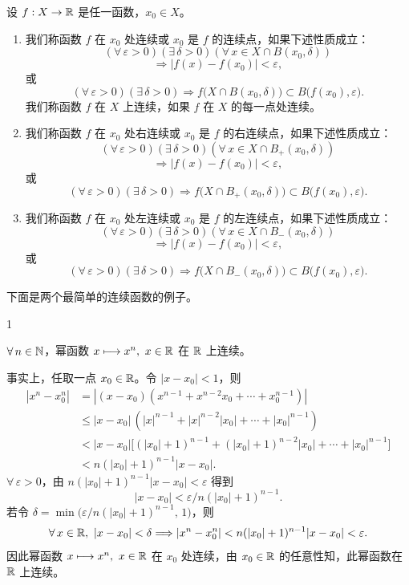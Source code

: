 \begin{mydef*}{}

	设 \(f:X\to\mathbb{R}\) 是任一函数，\(x_0\in X\)。

	\begin{enumerate}[label=\arabic*)]
		\item 我们称函数 \(f\) 在 \(x_0\) 处连续或 \(x_0\) 是 \(f\) 的连续点，如果下述性质成立：
		\[
		(\forall\,\varepsilon>0)(\exists\,\delta>0)(\forall\,x\in X\cap B(x_0,\delta))
		\]
		\[
		\Longrightarrow |f(x)-f(x_0)|<\varepsilon,
		\]
		或
		\[
		(\forall\,\varepsilon>0)(\exists\,\delta>0)\Longrightarrow f\bigl(X\cap B(x_0,\delta)\bigr)\subset B\bigl(f(x_0),\varepsilon\bigr).
		\]
		我们称函数 \(f\) 在 \(X\) 上连续，如果 \(f\) 在 \(X\) 的每一点处连续。

		\item 我们称函数 \(f\) 在 \(x_0\) 处右连续或 \(x_0\) 是 \(f\) 的右连续点，如果下述性质成立：
		\[
		(\forall\,\varepsilon>0)(\exists\,\delta>0)(\forall\,x\in X\cap B_+(x_0,\delta))
		\]
		\[
		\Longrightarrow |f(x)-f(x_0)|<\varepsilon,
		\]
		或
		\[
		(\forall\,\varepsilon>0)(\exists\,\delta>0)\Longrightarrow f\bigl(X\cap B_+(x_0,\delta)\bigr)\subset B\bigl(f(x_0),\varepsilon\bigr).
		\]

		\item 我们称函数 \(f\) 在 \(x_0\) 处左连续或 \(x_0\) 是 \(f\) 的左连续点，如果下述性质成立：
		\[
		(\forall\,\varepsilon>0)(\exists\,\delta>0)(\forall\,x\in X\cap B_-(x_0,\delta))
		\]
		\[
		\Longrightarrow |f(x)-f(x_0)|<\varepsilon,
		\]
		或
		\[
		(\forall\,\varepsilon>0)(\exists\,\delta>0)\Longrightarrow f\bigl(X\cap B_-(x_0,\delta)\bigr)\subset B\bigl(f(x_0),\varepsilon\bigr).
		\]
	\end{enumerate}

\end{mydef*}

下面是两个最简单的连续函数的例子。

\begin{sourceexample}{1}

	\(\forall\,n\in\mathbb{N}\)，幂函数 \(x\longmapsto x^n,\ x\in\mathbb{R}\) 在 \(\mathbb{R}\) 上连续。

	事实上，任取一点 \(x_0\in\mathbb{R}\)。令 \(|x-x_0|<1\)，则
	\[
	\begin{aligned}
	|x^n-x_0^n|
	&=|(x-x_0)(x^{n-1}+x^{n-2}x_0+\cdots+x_0^{n-1})|\\
	&\le|x-x_0|\,(|x|^{n-1}+|x|^{n-2}|x_0|+\cdots+|x_0|^{n-1})\\
	&<|x-x_0|\bigl[(|x_0|+1)^{n-1}+(|x_0|+1)^{n-2}|x_0|+\cdots+|x_0|^{n-1}\bigr]\\
	&<n(|x_0|+1)^{n-1}|x-x_0|.
	\end{aligned}
	\]
	\(\forall\,\varepsilon>0\)，由 \(n(|x_0|+1)^{n-1}|x-x_0|<\varepsilon\) 得到
	\[
	|x-x_0|<\varepsilon/n(|x_0|+1)^{n-1}.
	\]
	若令 \(\delta=\min\bigl(\varepsilon/n(|x_0|+1)^{n-1},\,1\bigr)\)，则
	\[
	\forall\,x\in\R,\ |x-x_0|<\delta\Longrightarrow|x^n-x_0^n|<n(|x_0|+1)^{n-1}|x-x_0|<\varepsilon.
	\]
	因此幂函数 \(x\longmapsto x^n,\ x\in\mathbb{R}\) 在 \(x_0\) 处连续，由 \(x_0\in\mathbb{R}\) 的任意性知，此幂函数在 \(\mathbb{R}\) 上连续。

\end{sourceexample}

